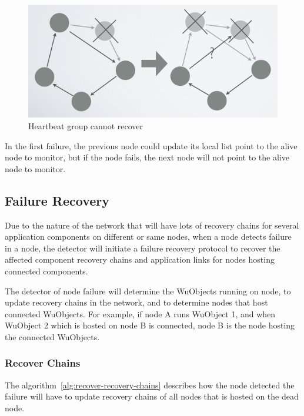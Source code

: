 \begin{figure}[h!]
\caption{Heartbeat group cannot recover}
\label{fig:recovery-heartbeat-group-need-synchronization}
\centering
    \includegraphics[width=\linewidth]{figures/recovery-heartbeat-group-need-synchronization}
\end{figure}

In the first failure, the previous node could update its local list point to
the alive node to monitor, but if the node fails, the next node will not point
to the alive node to monitor.


\subsection{Failure Recovery}


Due to the nature of the network that will have lots of recovery chains for
several application components on different or same nodes, when a node detects
failure in a node, the detector will initiate a failure recovery protocol to
recover the affected component recovery chains and application links for
nodes hosting connected components.

The detector of node failure will determine the WuObjects running on node, to
update recovery chains in the network, and to determine nodes that host
connected WuObjects. For example, if node A runs WuObject 1, and when WuObject
2 which is hosted on node B is connected, node B is the node hosting the
  connected WuObjects.

\subsubsection{Recover Chains}

The algorithm~\ref{alg:recover-recovery-chains} describes how the node detected
the failure will have to update recovery chains of all nodes that is hosted on
the dead node.

